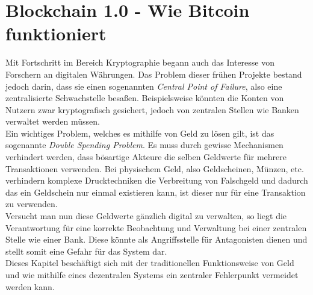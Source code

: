 \chapter{Blockchain 1.0 - Wie Bitcoin funktioniert}
Mit Fortschritt im Bereich Kryptographie begann auch das Interesse von Forschern an digitalen Währungen. 
Das Problem dieser frühen Projekte bestand jedoch darin, dass sie einen sogenannten \emph{Central Point of Failure}, also eine zentralisierte Schwachstelle besaßen. 
Beispielsweise könnten die Konten von Nutzern zwar kryptografisch gesichert, jedoch von zentralen Stellen wie Banken verwaltet werden müssen.\\
Ein wichtiges Problem, welches es mithilfe von Geld zu lösen gilt, ist das sogenannte \emph{Double Spending Problem}. Es muss durch gewisse Mechanismen verhindert werden, dass bösartige Akteure die selben Geldwerte für mehrere Transaktionen verwenden. Bei physischem Geld, also Geldscheinen, Münzen, etc. verhindern komplexe Drucktechniken die Verbreitung von Falschgeld und dadurch das ein Geldschein nur einmal existieren kann, ist dieser nur für eine Transaktion zu verwenden.\\
Versucht man nun diese Geldwerte gänzlich digital zu verwalten, so liegt die Verantwortung für eine korrekte Beobachtung und Verwaltung bei einer zentralen Stelle wie einer Bank. Diese könnte als Angriffsstelle für Antagonisten dienen und stellt somit eine Gefahr für das System dar.\\
Dieses Kapitel beschäftigt sich mit der traditionellen Funktionsweise von Geld und wie mithilfe eines dezentralen Systems ein zentraler Fehlerpunkt vermeidet werden kann. 
